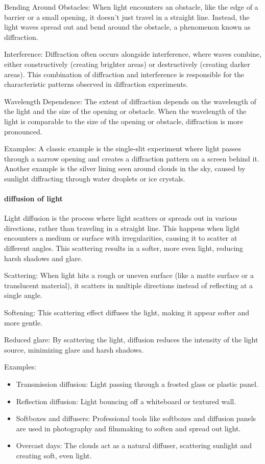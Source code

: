 \documentclass[a4paper]{article}
\theoremstyle{plain}
\theoremstyle{definition}
\begin{document}
Bending Around Obstacles: When light encounters an obstacle, like the
edge of a barrier or a small opening, it doesn't just travel in a
straight line.  Instead, the light waves spread out and bend around
the obstacle, a phenomenon known as diffraction.

Interference: Diffraction often occurs alongside interference, where
waves combine, either constructively (creating brighter areas) or
destructively (creating darker areas).  This combination of diffraction
and interference is responsible for the characteristic patterns
observed in diffraction experiments.

Wavelength Dependence: The extent of diffraction depends on the
wavelength of the light and the size of the opening or obstacle.  When
the wavelength of the light is comparable to the size of the opening
or obstacle, diffraction is more pronounced.

Examples: A classic example is the single-slit experiment where light
passes through a narrow opening and creates a diffraction pattern on a
screen behind it.  Another example is the silver lining seen around
clouds in the sky, caused by sunlight diffracting through water
droplets or ice crystals.


\paragraph{diffusion of light}

Light diffusion is the process where light scatters or spreads out in
various directions, rather than traveling in a straight line.  This
happens when light encounters a medium or surface with irregularities,
causing it to scatter at different angles.  This scattering results in
a softer, more even light, reducing harsh shadows and glare.

Scattering: When light hits a rough or uneven surface (like a matte
surface or a translucent material), it scatters in multiple directions
instead of reflecting at a single angle.

Softening: This scattering effect diffuses the light, making it appear
softer and more gentle.

Reduced glare: By scattering the light, diffusion reduces the
intensity of the light source, minimizing glare and harsh shadows.

Examples:
\begin{itemize}
\item Transmission diffusion: Light passing through a frosted glass or
  plastic panel.
\item Reflection diffusion: Light bouncing off a whiteboard or
  textured wall.
\item Softboxes and diffusers: Professional tools like softboxes and
  diffusion panels are used in photography and filmmaking to soften
  and spread out light.
\item Overcast days: The clouds act as a natural diffuser, scattering
  sunlight and creating soft, even light.
\end{itemize}
\end{document}
